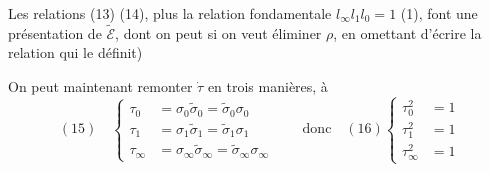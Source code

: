Les relations (13) (14), plus la relation fondamentale $l_\infty l_1l_0=1$ (1), font une présentation de $\tilde{\mathcal E}$, dont on peut si on veut éliminer $\rho$, \unsure{(}en omettant d'écrire la relation qui le définit)

On peut maintenant remonter $\dot\tau$ en trois manières, à 
\[
(15)\quad\left\{\begin{aligned}
\tau_0&=\sigma_0\tilde\sigma_0=\tilde\sigma_0\sigma_0\\
\tau_1&=\sigma_1\tilde\sigma_1=\tilde\sigma_1\sigma_1\\
\tau_\infty&=\sigma_\infty\tilde\sigma_\infty=\tilde\sigma_\infty\sigma_\infty
\end{aligned}\right.
\qquad\text{donc}\quad(16)\left\{\begin{aligned}
\tau_0^2&=1\\\tau_1^2&=1\\\tau_\infty^2&=1
\end{aligned}\right.
\]
